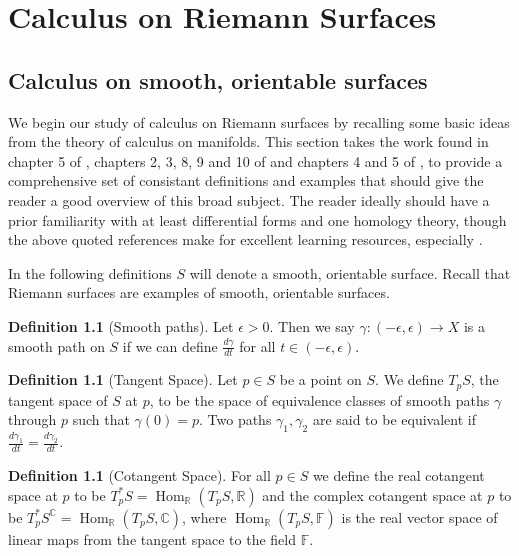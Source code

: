 \documentclass[11pt]{report}
\theoremstyle{definition}
\newtheorem{defn}[thm]{Definition}
\DeclareMathOperator{\Hom}{Hom}
\begin{document}
\chapter{Calculus on Riemann Surfaces}

\section{Calculus on smooth, orientable surfaces}
We begin our study of calculus on Riemann surfaces by recalling some basic ideas from the theory of calculus on manifolds. This section takes the work found in chapter 5 of \cite{donaldson}, chapters 2, 3, 8, 9 and 10 of \cite{calcohomo} and chapters 4 and 5 of \cite{spivak}, to provide a comprehensive set of consistant definitions and examples that should give the reader a good overview of this broad subject. The reader ideally should have a prior familiarity with at least differential forms and one homology theory, though the above quoted references make for excellent learning resources, especially \cite{calcohomo}. 

In the following definitions $S$ will denote a smooth, orientable surface. Recall that Riemann surfaces are examples of smooth, orientable surfaces. 

\begin{defn}[Smooth paths]\label{Smooth Path}
  Let $\epsilon > 0$. Then we say $\gamma:(-\epsilon,\epsilon) \rightarrow X$ is a smooth path on $S$ if we can define $\frac{d\gamma}{dt}$ for all $t \in (-\epsilon,\epsilon)$.
\end{defn}

\begin{defn}[Tangent Space]\label{TpX}
  Let $p \in S$ be a point on $S$. We define $T_pS$, the tangent space of $S$ at
  $p$, to be the space of equivalence classes of smooth paths $\gamma$ through $p$ such that $\gamma(0)=p$. Two paths $\gamma_1, \gamma_2$ are said to be
  equivalent if $\frac{d\gamma_1}{dt}=\frac{d\gamma_2}{dt}$.
\end{defn}

\begin{defn}[Cotangent Space]\label{T*pX}
  For all $p \in S$ we define the real cotangent space at $p$ to be
  $T^*_pS = \Hom_{\mathbb{R}}(T_pS, \mathbb{R})$ and the complex cotangent
  space at $p$ to be $T^*_pS^{\mathbb{C}} = \Hom_{\mathbb{R}}(T_pS,\mathbb{C})$, where $\Hom_{\mathbb{R}}(T_pS, \mathbb{F})$ is the real vector space of linear maps from the tangent space to the field $\mathbb{F}$.
\end{defn}
\end{document}
